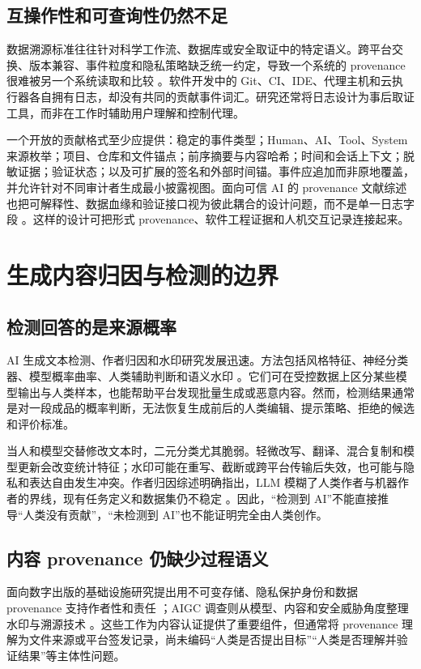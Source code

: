 \documentclass[UTF8,a4paper,12pt]{ctexart}
\begin{document}
\subsection{互操作性和可查询性仍然不足}
数据溯源标准往往针对科学工作流、数据库或安全取证中的特定语义。跨平台交换、版本兼容、事件粒度和隐私策略缺乏统一约定，导致一个系统的 provenance 很难被另一个系统读取和比较 \cite{sharinginteroperableworkflow2018,traceabilityfortrustworthy2021}。软件开发中的 Git、CI、IDE、代理主机和云执行器各自拥有日志，却没有共同的贡献事件词汇。研究还常将日志设计为事后取证工具，而非在工作时辅助用户理解和控制代理。

一个开放的贡献格式至少应提供：稳定的事件类型；Human、AI、Tool、System 来源枚举；项目、仓库和文件锚点；前序摘要与内容哈希；时间和会话上下文；脱敏证据；验证状态；以及可扩展的签名和外部时间锚。事件应追加而非原地覆盖，并允许针对不同审计者生成最小披露视图。面向可信 AI 的 provenance 文献综述也把可解释性、数据血缘和验证接口视为彼此耦合的设计问题，而不是单一日志字段 \cite{provenancedocumentationto2022,traceabilityfortrustworthy2021}。这样的设计可把形式 provenance、软件工程证据和人机交互记录连接起来。

\section{生成内容归因与检测的边界}
\subsection{检测回答的是来源概率}
AI 生成文本检测、作者归因和水印研究发展迅速。方法包括风格特征、神经分类器、模型概率曲率、人类辅助判断和语义水印 \cite{machinegeneratedtext2023,cognitiveconstraintsimulation2023,distinguishinghumanfrom2024,curvemarkdetectingai2025}。它们可在受控数据上区分某些模型输出与人类样本，也能帮助平台发现批量生成或恶意内容。然而，检测结果通常是对一段成品的概率判断，无法恢复生成前后的人类编辑、提示策略、拒绝的候选和评价标准。

当人和模型交替修改文本时，二元分类尤其脆弱。轻微改写、翻译、混合复制和模型更新会改变统计特征；水印可能在重写、截断或跨平台传输后失效，也可能与隐私和表达自由发生冲突。作者归因综述明确指出，LLM 模糊了人类作者与机器作者的界线，现有任务定义和数据集仍不稳定 \cite{authorshipattributionin2025}。因此，“检测到 AI”不能直接推导“人类没有贡献”，“未检测到 AI”也不能证明完全由人类创作。

\subsection{内容 provenance 仍缺少过程语义}
面向数字出版的基础设施研究提出用不可变存储、隐私保护身份和数据 provenance 支持作者性和责任 \cite{rethinkingdatainfrastructure2022}；AIGC 调查则从模型、内容和安全威胁角度整理水印与溯源技术 \cite{asurveyon2023,asurveyon20231}。这些工作为内容认证提供了重要组件，但通常将 provenance 理解为文件来源或平台签发记录，尚未编码“人类是否提出目标”“人类是否理解并验证结果”等主体性问题。
\end{document}
